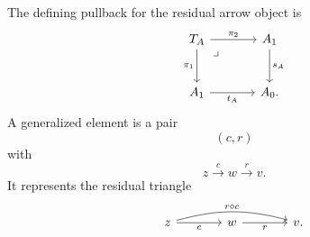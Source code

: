 The defining pullback for the residual arrow object is
\[
    \begin{tikzcd}[column sep=large, row sep=large]
            T_A
                \arrow[r, "\pi_2"]
                \arrow[d, "\pi_1"']
                \arrow[dr, phantom, "\lrcorner", very near start]
        &
            A_1
                \arrow[d, "s_A"]
        \\
            A_1
                \arrow[r, "t_A"']
        &
            A_0.
    \end{tikzcd}
\]
A generalized element is a pair
\[
    (c,r)
\]
with
\[
    z\xrightarrow{c}w\xrightarrow{r}v.
\]
It represents the residual triangle
\[
    \begin{tikzcd}[column sep=large, row sep=large]
            z
                \arrow[rr, "r\circ c", bend left=15]
                \arrow[r, "c"']
        &
            w
                \arrow[r, "r"']
        &
            v.
    \end{tikzcd}
\]

